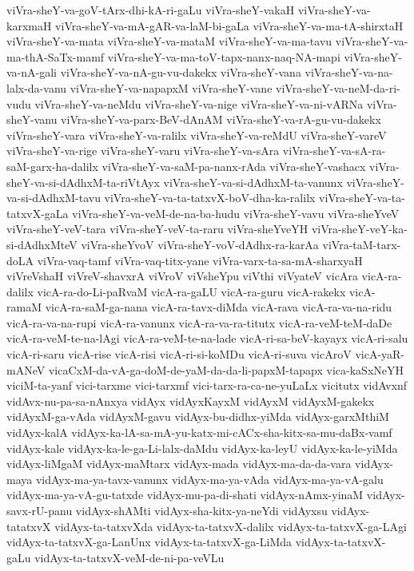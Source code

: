 {viVra-sheY-va-goV-tArx-dhi-kA-ri-gaLu
viVra-sheY-vakaH
viVra-sheY-va-karxmaH
viVra-sheY-va-mA-gAR-va-laM-bi-gaLa
viVra-sheY-va-ma-tA-shirxtaH
viVra-sheY-va-mata
viVra-sheY-va-mataM
viVra-sheY-va-ma-tavu
viVra-sheY-va-ma-thA-SaTx-mamf
viVra-sheY-va-ma-toV-tapx-nanx-naq-NA-mapi
viVra-sheY-va-nA-gali
viVra-sheY-va-nA-gu-vu-dakekx
viVra-sheY-vana
viVra-sheY-va-na-lalx-da-vanu
viVra-sheY-va-napapxM
viVra-sheY-vane
viVra-sheY-va-neM-da-ri-vudu
viVra-sheY-va-neMdu
viVra-sheY-va-nige
viVra-sheY-va-ni-vARNa
viVra-sheY-vanu
viVra-sheY-va-parx-BeV-dAnAM
viVra-sheY-va-rA-gu-vu-dakekx
viVra-sheY-vara
viVra-sheY-va-ralilx
viVra-sheY-va-reMdU
viVra-sheY-vareV
viVra-sheY-va-rige
viVra-sheY-varu
viVra-sheY-va-sAra
viVra-sheY-va-sA-ra-saM-garx-ha-dalilx
viVra-sheY-va-saM-pa-nanx-rAda
viVra-sheY-vashacx
viVra-sheY-va-si-dAdhxM-ta-riVtAyx
viVra-sheY-va-si-dAdhxM-ta-vanunx
viVra-sheY-va-si-dAdhxM-tavu
viVra-sheY-va-ta-tatxvX-boV-dha-ka-ralilx
viVra-sheY-va-ta-tatxvX-gaLa
viVra-sheY-va-veM-de-na-ba-hudu
viVra-sheY-vavu
viVra-sheYveV
viVra-sheY-veV-tara
viVra-sheY-veV-ta-raru
viVra-sheYveYH
viVra-sheY-veY-ka-si-dAdhxMteV
viVra-sheYvoV
viVra-sheY-voV-dAdhx-ra-karAa
viVra-taM-tarx-doLA
viVra-vaq-tamf
viVra-vaq-titx-yane
viVra-varx-ta-sa-mA-sharxyaH
viVreVshaH
viVreV-shavxrA
viVroV
viVsheYpu
viVthi
viVyateV
vicAra
vicA-ra-dalilx
vicA-ra-do-Li-paRvaM
vicA-ra-gaLU
vicA-ra-guru
vicA-rakekx
vicA-ramaM
vicA-ra-saM-ga-nana
vicA-ra-tavx-diMda
vicA-rava
vicA-ra-va-na-ridu
vicA-ra-va-na-rupi
vicA-ra-vanunx
vicA-ra-va-ra-titutx
vicA-ra-veM-teM-daDe
vicA-ra-veM-te-na-lAgi
vicA-ra-veM-te-na-lade
vicA-ri-sa-beV-kayayx
vicA-ri-salu
vicA-ri-saru
vicA-rise
vicA-risi
vicA-ri-si-koMDu
vicA-ri-suva
vicAroV
vicA-yaR-mANeV
vicaCxM-da-vA-ga-doM-de-yaM-da-da-li-papxM-tapapx
vica-kaSxNeYH
viciM-ta-yanf
vici-tarxme
vici-tarxmf
vici-tarx-ra-ca-ne-yuLaLx
vicitutx
vidAvxnf
vidAvx-nu-pa-sa-nAnxya
vidAyx
vidAyxKayxM
vidAyxM
vidAyxM-gakekx
vidAyxM-ga-vAda
vidAyxM-gavu
vidAyx-bu-didhx-yiMda
vidAyx-garxMthiM
vidAyx-kalA
vidAyx-ka-lA-sa-mA-yu-katx-mi-cACx-sha-kitx-sa-mu-daBx-vamf
vidAyx-kale
vidAyx-ka-le-ga-Li-lalx-daMdu
vidAyx-ka-leyU
vidAyx-ka-le-yiMda
vidAyx-liMgaM
vidAyx-maMtarx
vidAyx-mada
vidAyx-ma-da-da-vara
vidAyx-maya
vidAyx-ma-ya-tavx-vanunx
vidAyx-ma-ya-vAda
vidAyx-ma-ya-vA-galu
vidAyx-ma-ya-vA-gu-tatxde
vidAyx-mu-pa-di-shati
vidAyx-nAmx-yinaM
vidAyx-savx-rU-panu
vidAyx-shAMti
vidAyx-sha-kitx-ya-neYdi
vidAyxsu
vidAyx-tatatxvX
vidAyx-ta-tatxvXda
vidAyx-ta-tatxvX-dalilx
vidAyx-ta-tatxvX-ga-LAgi
vidAyx-ta-tatxvX-ga-LanUnx
vidAyx-ta-tatxvX-ga-LiMda
vidAyx-ta-tatxvX-gaLu
vidAyx-ta-tatxvX-veM-de-ni-pa-veVLu
}

